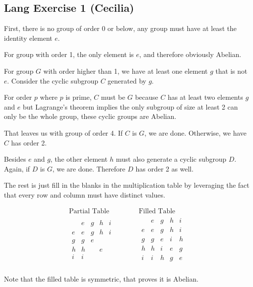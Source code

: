 \subsection*{Lang Exercise 1 (Cecilia)}

First, there is no group of order 0 or below, any group must have at least the identity element $e$.

For group with order 1, the only element is $e$, and therefore obviously Abelian.

For group $G$ with order higher than 1, we have at least one element $g$ that is not $e$. Consider the cyclic subgroup $C$ generated by $g$.

For order $p$ where $p$ is prime, $C$ must be $G$ because $C$ has at least two elements $g$ and $e$ but Lagrange's theorem implies the only subgroup of size at least 2 can only be the whole group, these cyclic groups are Abelian.

That leaves us with group of order 4. If $C$ is $G$, we are done. Otherwise, we have $C$ has order 2.

Besides $e$ and $g$, the other element $h$ must also generate a cyclic subgroup $D$. Again, if $D$ is $G$, we are done. Therefore $D$ has order 2 as well.

The rest is just fill in the blanks in the multiplication table by leveraging the fact that every row and column must have distinct values.

\[
\begin{array}{c|cc}
\text{Partial Table} & \qquad & \text{Filled Table} \\
\begin{array}{c|cccc}
     & e & g & h & i \\
    \hline
e & e & g & h & i \\
g & g & e &   &   \\
h & h &   & e &   \\
i & i &   &   &   \\
\end{array}
& \qquad &
\begin{array}{c|cccc}
     & e & g & h & i \\
    \hline
e & e & g & h & i \\
g & g & e & i & h \\
h & h & i & e & g \\
i & i & h & g & e \\
\end{array}
\end{array}
\]

Note that the filled table is symmetric, that proves it is Abelian.